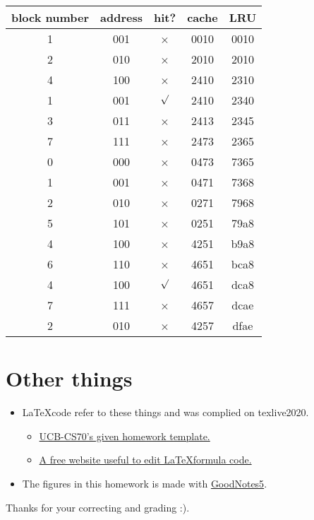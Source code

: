 \documentclass[11pt]{article}  %
\begin{document}
\begin{table}[H]
    \centering
    \begin{tabular}{|c|c|c|c|c|}
        \hline
        block number & address & hit?       & cache & LRU  \\ \hline
        1            & 001     & ×          & 0010  & 0010 \\ \hline
        2            & 010     & ×          & 2010  & 2010 \\ \hline
        4            & 100     & ×          & 2410  & 2310 \\ \hline
        1            & 001     & $\surd $    & 2410  & 2340 \\ \hline
        3            & 011     & ×          & 2413  & 2345 \\ \hline
        7            & 111     & ×          & 2473  & 2365 \\ \hline
        0            & 000     & ×          & 0473  & 7365 \\ \hline
        1            & 001     & ×          & 0471  & 7368 \\ \hline
        2            & 010     & ×          & 0271  & 7968 \\ \hline
        5            & 101     & ×          & 0251  & 79a8 \\ \hline
        4            & 100     & ×          & 4251  & b9a8 \\ \hline
        6            & 110     & ×          & 4651  & bca8 \\ \hline
        4            & 100     & $\surd $    & 4651  & dca8 \\ \hline
        7            & 111     & ×          & 4657  & dcae \\ \hline
        2            & 010     & ×          & 4257  & dfae \\ \hline
    \end{tabular}
\end{table}

\section*{Other things}

\begin{itemize}
    \item \LaTeX \space code refer to these things and was complied on texlive2020. 
    \begin{itemize}
        \item  \href{https://www.eecs70.org/assets/misc/homework_template.tex}{UCB-CS70's given homework template.} 
        \item  \href{https://www.latexlive.com}{A free website useful to edit \LaTeX \space formula code.}
    \end{itemize}
    \item The figures in this homework is made with \href{https://apps.apple.com/us/app/goodnotes-5/id1444383602}{GoodNotes5}.
\end{itemize}

    Thanks for your correcting and grading :).
\end{document}
